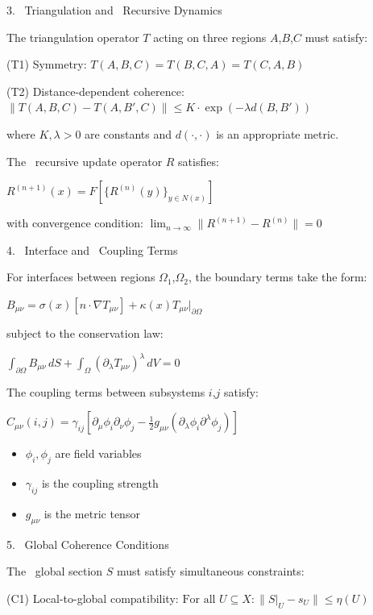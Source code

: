 3.~ Triangulation and~ Recursive Dynamics

The triangulation operator $T$ acting on three regions $A$,$B$,$C$ must satisfy:

(T1) Symmetry: $T(A,B,C) = T(B,C,A) = T(C,A,B)$

(T2) Distance-dependent coherence:
$\|T(A,B,C) - T(A,B',C)\| \leq \allowbreak K \cdot \exp(-\lambda d(B,B'))$

where $K,\lambda > 0$ are constants and $d(\cdot,\cdot)$ is an appropriate metric.

The~ recursive update operator $R$ satisfies:

$R^{(n+1)}(x) = F[\{R^{(n)}(y)\}_{y \in N(x)}]$

with convergence condition:
$\lim_{n \rightarrow \infty} \|R^{(n+1)} - R^{(n)}\| = 0$

4.~ Interface and~ Coupling Terms

For interfaces between regions $\Omega_1$,$\Omega_2$, the boundary terms take the form:

$B_{\mu\nu} = \sigma(x)[n \cdot \nabla T_{\mu\nu}] + \kappa(x)T_{\mu\nu}|_{\partial\Omega}$

subject to the conservation law:

$\int_{\partial\Omega} B_{\mu\nu} \,dS + \int_\Omega (\partial_\lambda T_{\mu\nu})^\lambda \,dV = 0$

The coupling terms between subsystems $i$,$j$ satisfy:

$C_{\mu\nu}(i,j) = \gamma_{ij}[\partial_\mu\phi_i\partial_\nu\phi_j - \tfrac{1}{2}g_{\mu\nu}(\partial_\lambda\phi_i\partial^\lambda\phi_j)]$

\begin{itemize}
  \item $\phi_i,\phi_j$ are field variables
  \item $\gamma_{ij}$ is the coupling strength
  \item $g_{\mu\nu}$ is the metric tensor
\end{itemize}

5.~ Global Coherence Conditions

The~ global section $S$ must satisfy simultaneous constraints:

(C1) Local-to-global compatibility:
$\text{For all } U \subseteq X: \|S|_U - s_U\| \leq \eta(U)$

